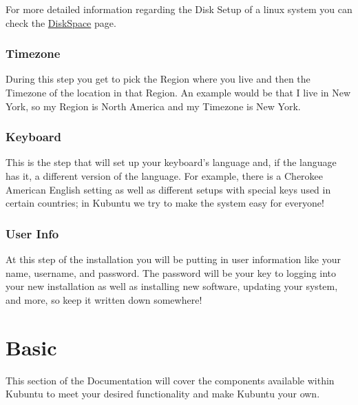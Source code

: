 \documentclass[letterpaper,10pt,english]{sphinxmanual}
\begin{document}
For more detailed information regarding the Disk Setup of a linux system you can check the \href{https://help.ubuntu.com/community/DiskSpace}{DiskSpace} page.


\subsection{Timezone}
\label{docs/installation:timezone}
During this step you get to pick the Region where you live and then the Timezone of the location in that Region. An example would be that I live in New York, so my Region is North America and my Timezone is New York.



\subsection{Keyboard}
\label{docs/installation:keyboard}
This is the step that will set up your keyboard's language and, if the language has it, a different version of the language. For example, there is a Cherokee American English setting as well as different setups with special keys used in certain countries; in Kubuntu we try to make the system easy for everyone!



\subsection{User Info}
\label{docs/installation:user-info}
At this step of the installation you will be putting in user information like your name, username, and password. The password will be your key to logging into your new installation as well as installing new software, updating your system, and more, so keep it written down somewhere!



\chapter{Basic}
\label{docs/basic::doc}\label{docs/basic:basic-link}\label{docs/basic:basic}
This section of the Documentation will cover the components available within Kubuntu to meet your desired functionality and make Kubuntu your own.
\end{document}
